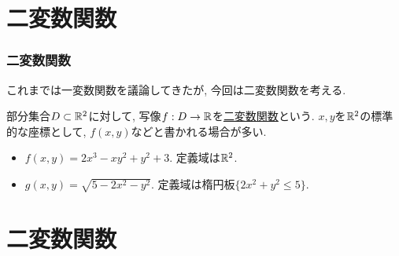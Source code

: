 




\section{二変数関数}


\begin{frame}
\frametitle{二変数関数}


これまでは一変数関数を議論してきたが, 今回は二変数関数を考える. 


\begin{Def}
部分集合$D \subset \mathbb{R}^2$に対して, 写像$f:D\rightarrow \mathbb{R}$を\underline{二変数関数}という. 
$x,y$を$\mathbb{R}^2$の標準的な座標として, $f(x,y)$などと書かれる場合が多い. 
\end{Def}

\begin{itemize}
\item $f(x,y)=2x^3-xy^2+y^2+3$. 定義域は$\mathbb{R}^2$. 
\item $g(x,y)=\sqrt{5-2x^2-y^2}$. 定義域は楕円板$\{2x^2+y^2 \le 5\}$. 

\end{itemize}


\end{frame}






\section{二変数関数}


